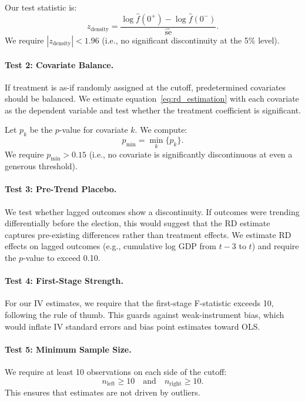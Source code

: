 \documentclass[12pt,a4paper]{article}
\begin{document}
Our test statistic is:
\begin{equation}
    z_{\text{density}} = \frac{\log \hat{f}(0^+) - \log \hat{f}(0^-)}
    {\hat{\text{se}}}.
\end{equation}
We require $|z_{\text{density}}| < 1.96$ (i.e., no significant 
discontinuity at the 5\% level).

\paragraph{Test 2: Covariate Balance.}
If treatment is as-if randomly assigned at the cutoff, predetermined 
covariates should be balanced. We estimate equation~\eqref{eq:rd_estimation} 
with each covariate as the dependent variable and test whether the 
treatment coefficient is significant.

Let $p_k$ be the $p$-value for covariate $k$. We compute:
\begin{equation}
    p_{\min} = \min_k \{p_k\}.
\end{equation}
We require $p_{\min} > 0.15$ (i.e., no covariate is significantly 
discontinuous at even a generous threshold).

\paragraph{Test 3: Pre-Trend Placebo.}
We test whether lagged outcomes show a discontinuity. If outcomes were 
trending differentially before the election, this would suggest that 
the RD estimate captures pre-existing differences rather than treatment 
effects. We estimate RD effects on lagged outcomes (e.g., cumulative 
log GDP from $t-3$ to $t$) and require the $p$-value to exceed 0.10.

\paragraph{Test 4: First-Stage Strength.}
For our IV estimates, we require that the first-stage F-statistic 
exceeds 10, following the \citet{stock2005testing} rule of thumb. 
This guards against weak-instrument bias, which would inflate IV 
standard errors and bias point estimates toward OLS.

\paragraph{Test 5: Minimum Sample Size.}
We require at least 10 observations on each side of the cutoff:
\begin{equation}
    n_{\text{left}} \geq 10 \quad \text{and} \quad n_{\text{right}} \geq 10.
\end{equation}
This ensures that estimates are not driven by outliers.
\end{document}
